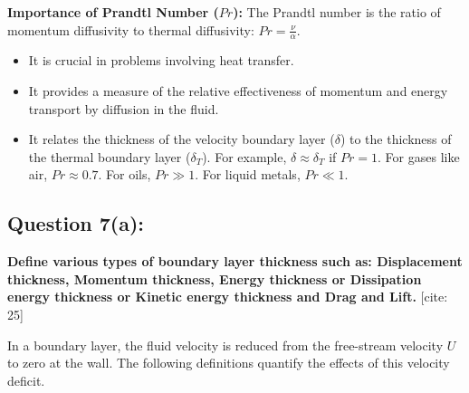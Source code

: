 \documentclass{article}
\begin{document}
\textbf{Importance of Prandtl Number ($Pr$):}
The Prandtl number is the ratio of momentum diffusivity to thermal diffusivity: $Pr = \frac{\nu}{\alpha}$.
\begin{itemize}
    \item It is crucial in problems involving heat transfer.
    \item It provides a measure of the relative effectiveness of momentum and energy transport by diffusion in the fluid.
    \item It relates the thickness of the velocity boundary layer ($\delta$) to the thickness of the thermal boundary layer ($\delta_T$). For example, $\delta \approx \delta_T$ if $Pr=1$. For gases like air, $Pr \approx 0.7$. For oils, $Pr \gg 1$. For liquid metals, $Pr \ll 1$.
\end{itemize}
\hrulefill

\subsection*{\textbf{Question 7(a):}}
\textbf{Define various types of boundary layer thickness such as: Displacement thickness, Momentum thickness, Energy thickness or Dissipation energy thickness or Kinetic energy thickness and Drag and Lift.} [cite: 25]

In a boundary layer, the fluid velocity is reduced from the free-stream velocity $U$ to zero at the wall. The following definitions quantify the effects of this velocity deficit.
\end{document}
